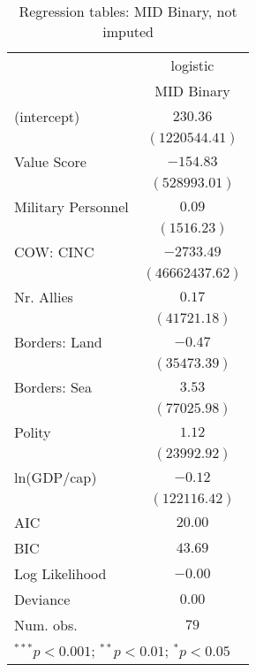 
\begin{table}
\begin{center}
\begin{tabular}{l c}
\toprule
 & \multicolumn{1}{c}{logistic} \\
\cmidrule(lr){2-2}
 & MID Binary \\
\midrule
(intercept)        & $230.36$        \\
                   & $(1220544.41)$  \\
Value Score        & $-154.83$       \\
                   & $(528993.01)$   \\
Military Personnel & $0.09$          \\
                   & $(1516.23)$     \\
COW: CINC          & $-2733.49$      \\
                   & $(46662437.62)$ \\
Nr. Allies         & $0.17$          \\
                   & $(41721.18)$    \\
Borders: Land      & $-0.47$         \\
                   & $(35473.39)$    \\
Borders: Sea       & $3.53$          \\
                   & $(77025.98)$    \\
Polity             & $1.12$          \\
                   & $(23992.92)$    \\
ln(GDP/cap)        & $-0.12$         \\
                   & $(122116.42)$   \\
\midrule
AIC                & $20.00$         \\
BIC                & $43.69$         \\
Log Likelihood     & $-0.00$         \\
Deviance           & $0.00$          \\
Num. obs.          & $79$            \\
\bottomrule
\multicolumn{2}{l}{\scriptsize{$^{***}p<0.001$; $^{**}p<0.01$; $^{*}p<0.05$}}
\end{tabular}
\caption{Regression tables: MID Binary, not imputed}
\label{MIDni}
\end{center}
\end{table}
